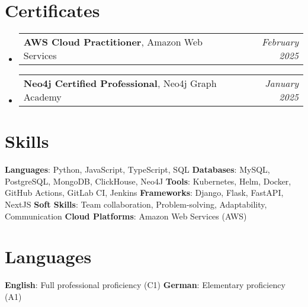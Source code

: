 \documentclass[letterpaper,11pt]{article}
\makeatletter
\newcommand{\resumeItem}[2]{
  \item\small{
    \textbf{#1}{: #2 \vspace{-2pt}}
  }
}
\newcommand{\resumeSubItem}[2]{\resumeItem{#1}{#2}\vspace{-4pt}}
\newcommand{\resumeSubHeadingListStart}{\begin{itemize}[leftmargin=*]}
\newcommand{\resumeSubHeadingListEnd}{\end{itemize}}
\newcommand{\titleWithDescription}[2]{\textbf{#1}{: #2}}
\newcommand{\resumeLanguages}[4]{
  \section{Languages}
    \noindent
    \titleWithDescription{#1}{#2}
    \hfill
    \titleWithDescription{#3}{#4}
}
\newcommand{\certificateItem}[3]{
  \item\begin{tabular*}{0.97\textwidth}{l@{\extracolsep{\fill}}r}
    \small{
      \textbf{#1}{, #2 \vspace{-2pt}}
    } & \textit{\small #3} \\
  \end{tabular*}\vspace{-5pt}
}
\makeatother
\begin{document}

\section{Certificates}
  \resumeSubHeadingListStart

    \certificateItem
      {AWS Cloud Practitioner}
      {Amazon Web Services}
      {February 2025}\vspace{3px}

    \certificateItem
      {Neo4j Certified Professional}
      {Neo4j Graph Academy}
      {January 2025}

  \resumeSubHeadingListEnd

%
\section{Skills}

  \titleWithDescription{Languages}{Python, JavaScript, TypeScript, SQL}\vspace{3pt}
  \hfill
  \titleWithDescription{Databases}{MySQL, PostgreSQL, MongoDB, ClickHouse, Neo4J}
  \newline
  \titleWithDescription{Tools}{Kubernetes, Helm, Docker, GitHub Actions, GitLab CI, Jenkins}
  \hfill
  \titleWithDescription{Frameworks}{Django, Flask, FastAPI, NextJS}\vspace{3pt}
  \newline
  \titleWithDescription{Soft Skills}{Team collaboration, Problem-solving, Adaptability, Communication}
  \hfill
  \titleWithDescription{Cloud Platforms}{Amazon Web Services (AWS)}
\resumeLanguages
  {English}
  {Full professional proficiency (C1)}
  {German}
  {Elementary proficiency (A1)}
\end{document}
